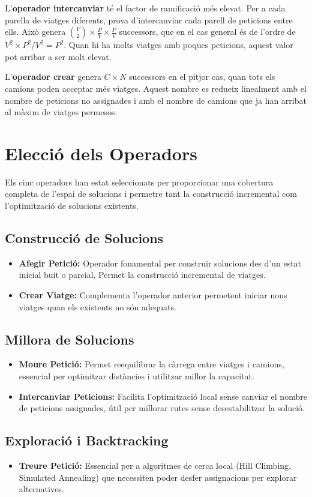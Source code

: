 \vspace{0.5em}
L'\textbf{operador intercanviar} té el factor de ramificació més elevat. Per a cada parella de viatges diferents, prova d'intercanviar cada parell de peticions entre ells. Això genera $\binom{V}{2} \times \frac{P}{V} \times \frac{P}{V}$ successors, que en el cas general és de l'ordre de $V^2 \times P^2 / V^2 = P^2$. Quan hi ha molts viatges amb poques peticions, aquest valor pot arribar a ser molt elevat.

\vspace{0.5em}
L'\textbf{operador crear} genera $C \times N$ successors en el pitjor cas, quan tots els camions poden acceptar més viatges. Aquest nombre es redueix linealment amb el nombre de peticions no assignades i amb el nombre de camions que ja han arribat al màxim de viatges permesos.
\section{Elecció dels Operadors}

Els cinc operadors han estat seleccionats per proporcionar una cobertura completa de l'espai de solucions i permetre tant la construcció incremental com l'optimització de solucions existents.

\subsection{Construcció de Solucions}
\begin{itemize}
    \item \textbf{Afegir Petició:} Operador fonamental per construir solucions des d'un estat inicial buit o parcial. Permet la construcció incremental de viatges.
    \item \textbf{Crear Viatge:} Complementa l'operador anterior permetent iniciar nous viatges quan els existents no són adequats.
\end{itemize}

\subsection{Millora de Solucions}
\begin{itemize}
    \item \textbf{Moure Petició:} Permet reequilibrar la càrrega entre viatges i camions, essencial per optimitzar distàncies i utilitzar millor la capacitat.
    \item \textbf{Intercanviar Peticions:} Facilita l'optimització local sense canviar el nombre de peticions assignades, útil per millorar rutes sense desestabilitzar la solució.
\end{itemize}

\subsection{Exploració i Backtracking}
\begin{itemize}
    \item \textbf{Treure Petició:} Essencial per a algoritmes de cerca local (Hill Climbing, Simulated Annealing) que necessiten poder desfer assignacions per explorar alternatives.
\end{itemize}
